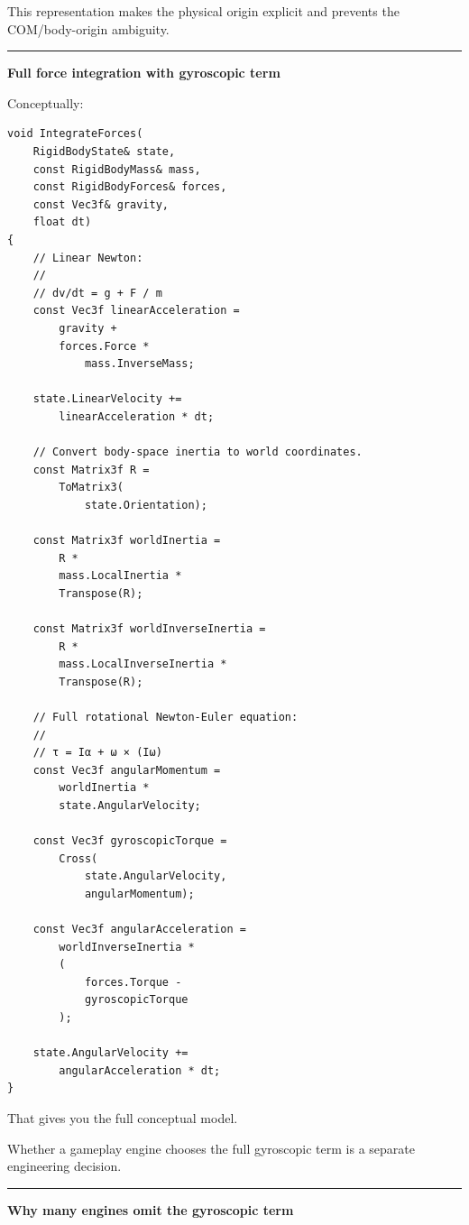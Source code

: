 This representation makes the physical origin explicit and prevents the COM/body-origin ambiguity.

\begin{center}\rule{0.5\linewidth}{0.5pt}\end{center}

\textbf{Full force integration with gyroscopic term}

Conceptually:

\begin{verbatim}
void IntegrateForces(
    RigidBodyState& state,
    const RigidBodyMass& mass,
    const RigidBodyForces& forces,
    const Vec3f& gravity,
    float dt)
{
    // Linear Newton:
    //
    // dv/dt = g + F / m
    const Vec3f linearAcceleration =
        gravity +
        forces.Force *
            mass.InverseMass;

    state.LinearVelocity +=
        linearAcceleration * dt;

    // Convert body-space inertia to world coordinates.
    const Matrix3f R =
        ToMatrix3(
            state.Orientation);

    const Matrix3f worldInertia =
        R *
        mass.LocalInertia *
        Transpose(R);

    const Matrix3f worldInverseInertia =
        R *
        mass.LocalInverseInertia *
        Transpose(R);

    // Full rotational Newton-Euler equation:
    //
    // τ = Iα + ω × (Iω)
    const Vec3f angularMomentum =
        worldInertia *
        state.AngularVelocity;

    const Vec3f gyroscopicTorque =
        Cross(
            state.AngularVelocity,
            angularMomentum);

    const Vec3f angularAcceleration =
        worldInverseInertia *
        (
            forces.Torque -
            gyroscopicTorque
        );

    state.AngularVelocity +=
        angularAcceleration * dt;
}
\end{verbatim}

That gives you the full conceptual model.

Whether a gameplay engine chooses the full gyroscopic term is a separate engineering decision.

\begin{center}\rule{0.5\linewidth}{0.5pt}\end{center}

\textbf{Why many engines omit the gyroscopic term}

